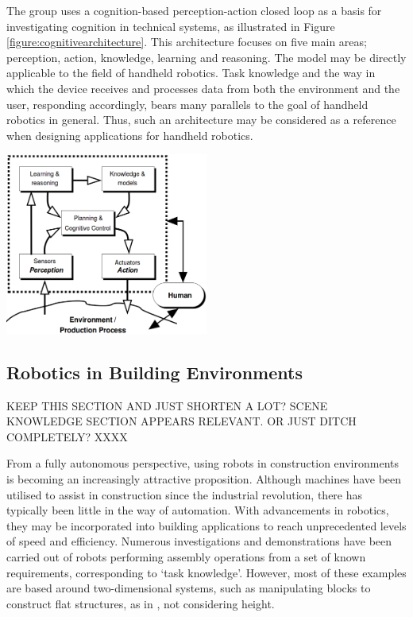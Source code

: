 \documentclass[11pt]{article}
\begin{document}
The group uses a cognition-based perception-action closed loop as a basis for investigating cognition in technical systems, as illustrated in Figure \ref{figure:cognitivearchitecture}. This architecture focuses on five main areas; perception, action, knowledge, learning and reasoning. The model may be directly applicable to the field of handheld robotics. Task knowledge and the way in which the device receives and processes data from both the environment and the user, responding accordingly, bears many parallels to the goal of handheld robotics in general. Thus, such an architecture may be considered as a reference when designing applications for handheld robotics. 

\begin{center}
\includegraphics[width = 0.5\textwidth]{cognitivearchitecture.png}
\label{figure:cognitivearchitecture}
\end{center}

\pagebreak














\subsection{Robotics in Building Environments} \label{building}

KEEP THIS SECTION AND JUST SHORTEN A LOT? SCENE KNOWLEDGE SECTION APPEARS RELEVANT. OR JUST DITCH COMPLETELY? XXXX

From a fully autonomous perspective, using robots in construction environments is becoming an increasingly attractive proposition. Although machines have been utilised to assist in construction since the industrial revolution, there has typically been little in the way of automation. With advancements in robotics, they may be incorporated into building applications to reach unprecedented levels of speed and efficiency. Numerous investigations and demonstrations have been carried out of robots performing assembly operations from a set of known requirements, corresponding to `task knowledge'. However, most of these examples are based around two-dimensional systems, such as manipulating blocks to construct flat structures, as in \cite{werfel2006}, not considering height.
\end{document}
